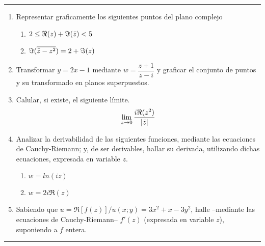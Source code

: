 \documentclass[9pt,a4paper]{extarticle}
\begin{document}
\hrule
{}
\begin{enumerate}


    \item Representar graficamente los siguientes puntos del plano complejo
    \begin{enumerate}
        \item $2 \leq \Re(z) + \Im(\Bar{z}) < 5$
        \item $\Im(\overline{ \Bar{z} - z^{2} }) = 2 + \Im(z)$
    \end{enumerate}
    \item Transformar $y=2x-1$ mediante $w=\dfrac{z+1}{z-i}$ y graficar el conjunto de puntos y su transformado en planos superpuestos.
    \item Calular, si existe, el siguiente límite. $$\lim_{z \to 0} \dfrac{i \Re(z^2)}{|\Bar{z}|}$$
    \item Analizar la derivabilidad de las siguientes funciones, mediante las ecuaciones de Cauchy-Riemann; y, de ser derivables, hallar su derivada, utilizando dichas ecuaciones, expresada en variable $z$.
    \begin{enumerate}
        \item $w=ln(iz)$
        \item $w=2i\Re(z)$
    \end{enumerate}
    \item Sabiendo que $u=\Re[f(z)]/u(x;y)=3x^2 + x -3y^2$, halle --mediante las ecuaciones de Cauchy-Riemann-- $f'(z)$ (expresada en variable $z$), suponiendo a $f$ entera.
\end{enumerate}
\hrule
\end{document}
